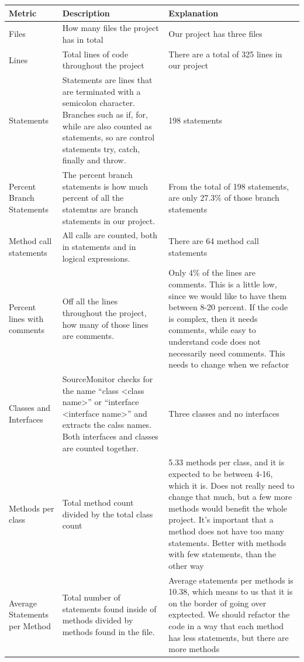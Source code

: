 \documentclass[UKenglish]{article}  %
\begin{document}
\begin{longtable}[H]{| m{1in} |  m{2in} | m{2in} |}
       \hline
       \textbf{Metric} & \textbf{Description} & \textbf{Explanation}\\
       \hline
        Files & How many files the project has in total & Our project has three files\\
       \hline
       Lines & Total lines of code throughout the project & There are a total of 325 lines in our project\\
       \hline
       Statements & Statements are lines that are terminated with a semicolon character. Branches such as if, for, while are also counted as statements, so are control statements try, catch, finally and throw. & 198 statements\\
       \hline
       Percent Branch Statements & The percent branch statements is how much percent of all the statemtns are branch statements in our project. & From the total of 198 statements, are only 27.3\% of those branch statements\\
       \hline
       Method call statements & All calls are counted, both in statements and in logical expressions. & There are 64 method call statements\\
       \hline
       Percent lines with comments & Off all the lines throughout the project, how many of those lines are comments. &  Only 4\% of the lines are comments. This is a little low, since we would like to have them between 8-20 percent. If the code is complex, then it needs comments, while easy to understand code does not necessarily need comments. This needs to change when we refactor \\
       \hline
       Classes and Interfaces & SourceMonitor checks for the name ``class <class name>'' or ``interface <interface name>'' and extracts the calss names. Both interfaces and classes are counted together. & Three classes and no interfaces \\
       \hline
       Methods per class & Total method count divided by the total class count & 5.33 methods per class, and it is expected to be between 4-16, which it is. Does not really need to change that much, but a few more methods would benefit the whole project. It's important that a method does not have too many statements. Better with methods with few statements, than the other way\\
       \hline
       Average Statements per Method & Total number of statements found inside of methods divided by methods found in the file. & Average statements per methods is 10.38, which means to us that it is on the border of going over exptected. We should refactor the code in a way that each method has less statements, but there are more methods \\

\end{longtable}
\end{document}
